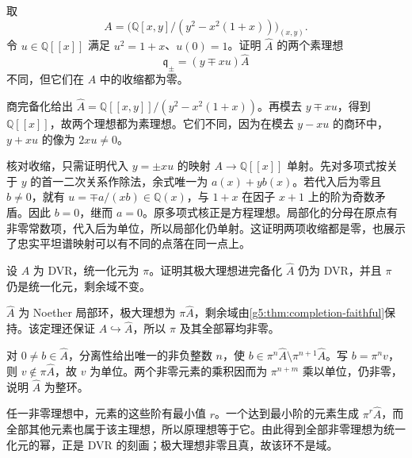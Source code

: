 \begin{exercise}\label{g5:ex:formal-node-prime-contractions}
	取
	\[
		A=\bigl(\mathbb Q[x,y]/(y^2-x^2(1+x))\bigr)_{(x,y)}.
	\]
	令 \(u\in\mathbb Q[[x]]\) 满足 \(u^2=1+x\)、\(u(0)=1\)。证明 \(\widehat A\) 的两个素理想
	\[
		\mathfrak q_\pm=(y\mp xu)\widehat A
	\]
	不同，但它们在 \(A\) 中的收缩都为零。
\end{exercise}
\begin{solution}
	商完备化给出
	\(\widehat A=\mathbb Q[[x,y]]/(y^2-x^2(1+x))\)。再模去 \(y\mp xu\)，得到 \(\mathbb Q[[x]]\)，故两个理想都为素理想。它们不同，因为在模去 \(y-xu\) 的商环中，\(y+xu\) 的像为 \(2xu\ne0\)。

	核对收缩，只需证明代入 \(y=\pm xu\) 的映射 \(A\to\mathbb Q[[x]]\) 单射。先对多项式按关于 \(y\) 的首一二次关系作除法，余式唯一为
	\(a(x)+yb(x)\)。若代入后为零且 \(b\ne0\)，就有
	\(u=\mp a/(xb)\in\mathbb Q(x)\)，与 \(1+x\) 在因子 \(x+1\) 上的阶为奇数矛盾。因此 \(b=0\)，继而 \(a=0\)。原多项式核正是方程理想。局部化的分母在原点有非零常数项，代入后为单位，所以局部化仍单射。这证明两项收缩都是零，也展示了忠实平坦谱映射可以有不同的点落在同一点上。
\end{solution}

\begin{exercise}\label{g5:ex:dvr-completion}
	设 \(A\) 为 DVR，统一化元为 \(\pi\)。证明其极大理想进完备化 \(\widehat A\) 仍为 DVR，并且 \(\pi\) 仍是统一化元，剩余域不变。
\end{exercise}
\begin{solution}
	\(\widehat A\) 为 Noether 局部环，极大理想为 \(\pi\widehat A\)，剩余域由\cref{g5:thm:completion-faithful}保持。该定理还保证 \(A\hookrightarrow\widehat A\)，所以 \(\pi\) 及其全部幂均非零。

	对 \(0\ne b\in\widehat A\)，分离性给出唯一的非负整数 \(n\)，使
	\(b\in\pi^n\widehat A\setminus\pi^{n+1}\widehat A\)。写 \(b=\pi^n v\)，则 \(v\notin\pi\widehat A\)，故 \(v\) 为单位。两个非零元素的乘积因而为 \(\pi^{n+m}\) 乘以单位，仍非零，说明 \(\widehat A\) 为整环。

	任一非零理想中，元素的这些阶有最小值 \(r\)。一个达到最小阶的元素生成 \(\pi^r\widehat A\)，而全部其他元素也属于该主理想，所以原理想等于它。由此得到全部非零理想为统一化元的幂，正是 DVR 的刻画；极大理想非零且真，故该环不是域。
\end{solution}

